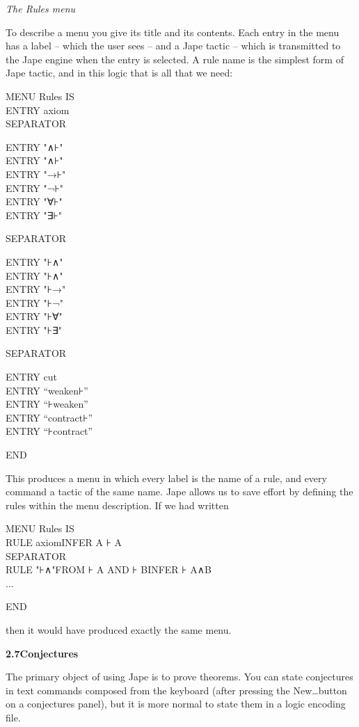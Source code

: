 \documentclass[11pt]{book}
\newcommand{\tab}{\hspace{5mm}}
\begin{document}
\textit{The Rules menu}


To describe a menu you give its title and its contents. Each entry in the menu has a label -- which the user sees -- and a Jape tactic -- which is transmitted to the Jape engine when the entry is selected. A rule name is the simplest form of Jape tactic, and in this logic that is all that we need:

MENU Rules IS\\
\tab ENTRY axiom\\
\tab SEPARATOR

\tab ENTRY "∧⊦"\\
\tab ENTRY "∧⊦"\\
\tab ENTRY "→⊦"\\
\tab ENTRY "¬⊦"\\
\tab ENTRY "∀⊦"\\
\tab ENTRY "∃⊦"

\tab SEPARATOR

\tab ENTRY "⊦∧"\\
\tab ENTRY "⊦∧"\\
\tab ENTRY "⊦→"\\
\tab ENTRY "⊦¬"\\
\tab ENTRY "⊦∀"\\
\tab ENTRY "⊦∃"

\tab SEPARATOR

\tab ENTRY cut\\
\tab ENTRY ``weaken⊦''\\
\tab ENTRY ``⊦weaken''\\
\tab ENTRY ``contract⊦''\\
\tab ENTRY ``⊦contract''

END


This produces a menu in which every label is the name of a rule, 
and every command a tactic of the same name. Jape allows us to 
save effort by defining the rules within the menu description. 
If we had written

MENU Rules IS\\
\tab RULE axiom\tab INFER A ⊦ A\\
\tab SEPARATOR\\
\tab RULE "⊦∧"\tab FROM ⊦ A AND ⊦ B\tab INFER ⊦ A∧B\\
\tab ...

END


then it would have produced exactly the same menu.


\textbf{{\large 2.7\tab Conjectures}}


The primary object of using Jape is to prove theorems. You can 
state conjectures in text commands composed from the keyboard 
(after pressing the New\dots  button on a conjectures panel), but 
it is more normal to state them in a logic encoding file.
\end{document}
